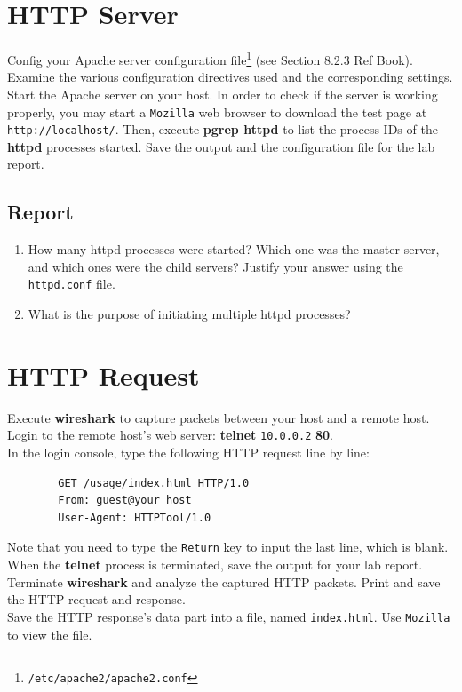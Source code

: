 \documentclass[10pt,a4paper]{article}
\numberwithin{equation}{section}
\numberwithin{figure}{section}
\numberwithin{table}{section}
\begin{document}
    \section{HTTP Server}
    Config your Apache server configuration file\footnote{\texttt{/etc/apache2/apache2.conf}} (see Section 8.2.3 Ref Book).
    Examine the various configuration directives used and the corresponding settings. \\
    Start the Apache server on your host.
    In order to check if the server is working properly, you may start a \texttt{Mozilla} web browser to download the test page at \texttt{http://localhost/}.
    Then, execute \textbf{pgrep httpd} to list the process IDs of the \textbf{httpd} processes started.
    Save the output and the configuration file for the lab report.
    \subsection*{Report}
    \begin{enumerate}
        \item How many httpd processes were started?
        Which one was the master server, and which ones were the child servers?
        Justify your answer using the \texttt{httpd.conf} file.
        \item What is the purpose of initiating multiple httpd processes?
    \end{enumerate}

    \section{HTTP Request}
    Execute \textbf{wireshark} to capture packets between your host and a remote host. \\
    Login to the remote host’s web server: \textbf{telnet} \texttt{10.0.0.2} \textbf{80}. \\
    In the login console, type the following HTTP request line by line:
    \begin{verbatim}
        GET /usage/index.html HTTP/1.0
        From: guest@your host
        User-Agent: HTTPTool/1.0
    \end{verbatim}
    Note that you need to type the \texttt{Return} key to input the last line, which is blank.
    When the \textbf{telnet} process is terminated, save the output for your lab report. \\
    Terminate \textbf{wireshark} and analyze the captured HTTP packets.
    Print and save the HTTP request and response. \\
    Save the HTTP response’s data part into a file, named \texttt{index.html}.
    Use \texttt{Mozilla} to view the file.
\end{document}
